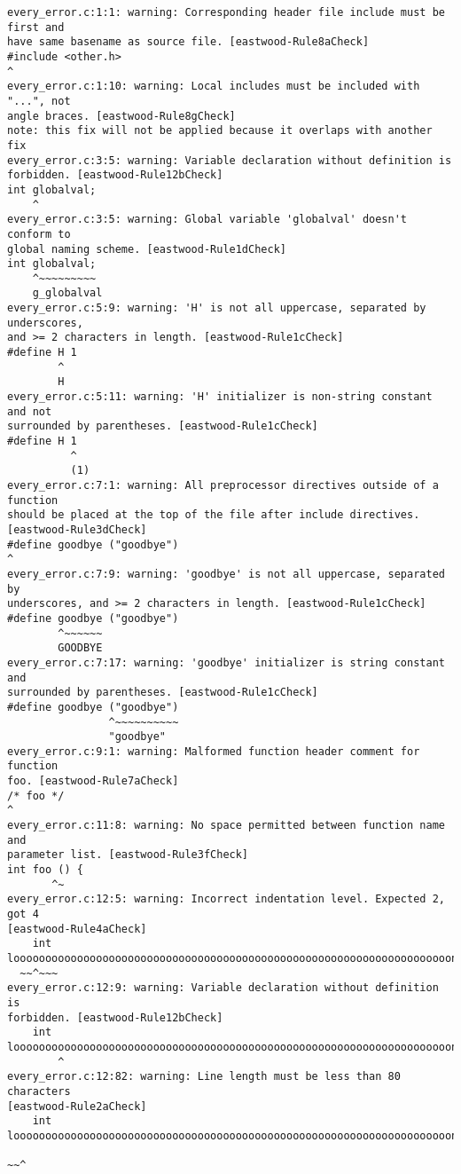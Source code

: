 \documentclass[sigconf]{acmart}
\begin{document}
\begin{lstlisting}[basicstyle=\tiny,caption={Example of \textit{Eastwood} output, formatted for width}, captionpos=b]
every_error.c:1:1: warning: Corresponding header file include must be first and
have same basename as source file. [eastwood-Rule8aCheck]
#include <other.h>
^
every_error.c:1:10: warning: Local includes must be included with "...", not
angle braces. [eastwood-Rule8gCheck]
note: this fix will not be applied because it overlaps with another fix
every_error.c:3:5: warning: Variable declaration without definition is
forbidden. [eastwood-Rule12bCheck]
int globalval;
    ^
every_error.c:3:5: warning: Global variable 'globalval' doesn't conform to
global naming scheme. [eastwood-Rule1dCheck]
int globalval;
    ^~~~~~~~~~
    g_globalval
every_error.c:5:9: warning: 'H' is not all uppercase, separated by underscores,
and >= 2 characters in length. [eastwood-Rule1cCheck]
#define H 1
        ^
        H
every_error.c:5:11: warning: 'H' initializer is non-string constant and not
surrounded by parentheses. [eastwood-Rule1cCheck]
#define H 1
          ^
          (1)
every_error.c:7:1: warning: All preprocessor directives outside of a function
should be placed at the top of the file after include directives.
[eastwood-Rule3dCheck]
#define goodbye ("goodbye")
^
every_error.c:7:9: warning: 'goodbye' is not all uppercase, separated by
underscores, and >= 2 characters in length. [eastwood-Rule1cCheck]
#define goodbye ("goodbye")
        ^~~~~~~
        GOODBYE
every_error.c:7:17: warning: 'goodbye' initializer is string constant and
surrounded by parentheses. [eastwood-Rule1cCheck]
#define goodbye ("goodbye")
                ^~~~~~~~~~~
                "goodbye"
every_error.c:9:1: warning: Malformed function header comment for function
foo. [eastwood-Rule7aCheck]
/* foo */
^
every_error.c:11:8: warning: No space permitted between function name and
parameter list. [eastwood-Rule3fCheck]
int foo () {
       ^~
every_error.c:12:5: warning: Incorrect indentation level. Expected 2, got 4
[eastwood-Rule4aCheck]
    int looooooooooooooooooooooooooooooooooooooooooooooooooooooooooooooooooooong;
  ~~^~~~
every_error.c:12:9: warning: Variable declaration without definition is
forbidden. [eastwood-Rule12bCheck]
    int looooooooooooooooooooooooooooooooooooooooooooooooooooooooooooooooooooong;
        ^
every_error.c:12:82: warning: Line length must be less than 80 characters
[eastwood-Rule2aCheck]
    int looooooooooooooooooooooooooooooooooooooooooooooooooooooooooooooooooooong;
                                                                               ~~^

\end{lstlisting}
\end{document}
